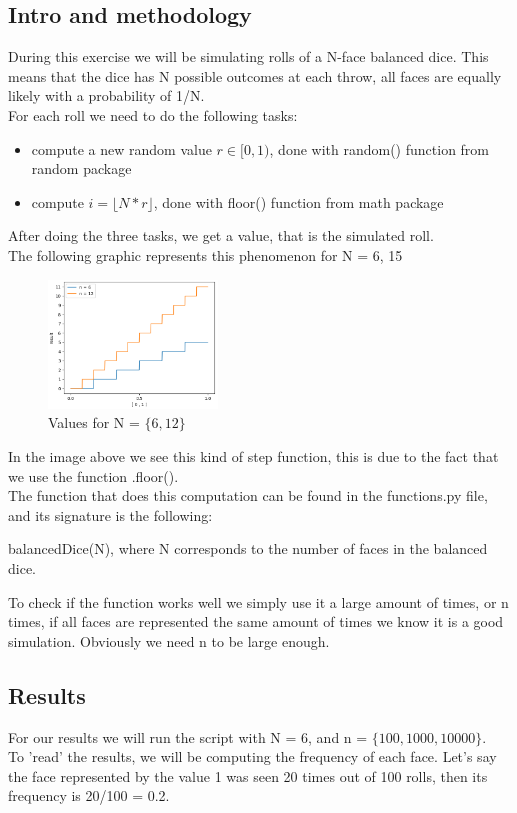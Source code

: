 \documentclass[a4paper]{article}
\begin{document}
\subsection*{Intro and methodology}
During this exercise we will be simulating rolls of a N-face balanced dice. This means that the dice has N possible outcomes at each throw, all faces are equally likely with a probability of 1/N.\\
For each roll we need to do the following tasks:
\begin{itemize}
\item [(1)] compute a new random value $r \in [0,1)$, done with random() function from random package
\item [(2)] compute $i = \lfloor N * r \rfloor$, done with floor() function from math package
\end{itemize}
After doing the three tasks, we get a value, that is the simulated roll.\\
The following graphic represents this phenomenon for N = {6, 15}\\
\begin{figure}[H]
\center
\includegraphics[width=0.4\textwidth]{images/balanced_dice.PNG}
\caption*{Values for N = $\{6, 12\}$}
\end{figure}
In the image above we see this kind of step function, this is due to the fact that we use the function .floor().\\
The function that does this computation can be found in the functions.py file, and its signature is the following:
\begin{center}
balancedDice(N), where N corresponds to the number of faces in the balanced dice.
\end{center}
To check if the function works well we simply use it a large amount of times, or n times, if all faces are represented the same amount of times we know it is a good simulation. Obviously we need n to be large enough.
\subsection*{Results}
For our results we will run the script with N = 6, and n = $\{ 100, 1000, 10000\}$.\\
To 'read' the results, we will be computing the frequency of each face. Let's say the face represented by the value 1 was seen 20 times out of 100 rolls, then its frequency is 20/100 = 0.2.
\end{document}
